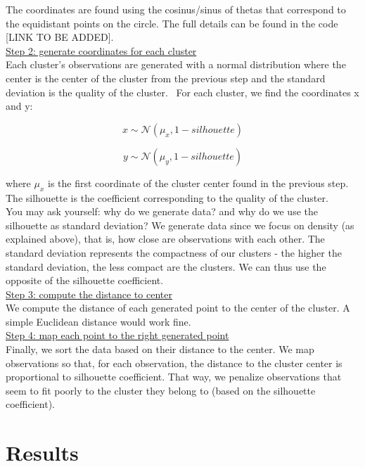 The coordinates are found using the cosinus/sinus of thetas that correspond to the equidistant points on the circle. The full details can be found in the code [LINK TO BE ADDED]. \\

\underline{Step 2: generate coordinates for each cluster} \\

Each cluster's observations are generated with a normal distribution where the center is the center of the cluster from the previous step and the standard deviation is the quality of the cluster. 
For each cluster, we find the coordinates x and y:

$$x \sim \mathcal{N}(\mu_x, 1-silhouette)$$

$$y \sim \mathcal{N}(\mu_y, 1-silhouette)$$

where $\mu_x$ is the first coordinate of the cluster center found in the previous step. The silhouette is the coefficient corresponding to the quality of the cluster. \\

You may ask yourself: why do we generate data? and why do we use the silhouette as standard deviation? We generate data since we focus on density (as explained above), that is, how close are observations with each other. The standard deviation represents the compactness of our clusters - the higher the standard deviation, the less compact are the clusters. We can thus use the opposite of the silhouette coefficient. \\

\underline{Step 3: compute the distance to center} \\

We compute the distance of each generated point to the center of the cluster. A simple Euclidean distance would work fine. \\

\underline{Step 4: map each point to the right generated point} \\

Finally, we sort the data based on their distance to the center. We map observations so that, for each observation, the distance to the cluster center is proportional to silhouette coefficient. That way, we penalize observations that seem to fit poorly to the cluster they belong to (based on the silhouette coefficient).

\section{Results}

